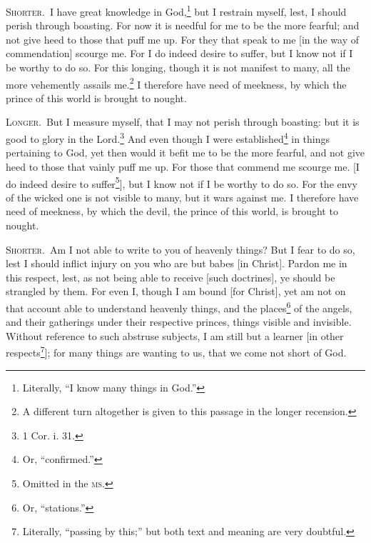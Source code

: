 
\textsc{Shorter.}~I have great knowledge in God,\footnote{Literally, “I know many things in God.”} but I restrain myself, lest, I should perish through boasting. For now it is needful for me to be the more fearful; and not give heed to those that puff me up. For they that speak to me [in the way of commendation] scourge me. For I do indeed desire to suffer, but I know not if I be worthy to do so. For this longing, though it is not manifest to many, all the more vehemently assails me.\footnote{A different turn altogether is given to this passage in the longer recension.} I therefore have need of meekness, by which the prince of this world is brought to nought.

\textsc{Longer.}~But I measure myself, that I may not perish through boasting: but it is good to glory in the Lord.\footnote{1 Cor. i. 31.} And even though I were established\footnote{Or, “confirmed.”} in things pertaining to God, yet then would it befit me to be the more fearful, and not give heed to those that vainly puff me up. For those that commend me scourge me. [I do indeed desire to suffer\footnote{Omitted in the \textsc{ms.}}], but I know not if I be worthy to do so. For the envy of the wicked one is not visible to many, but it wars against me. I therefore have need of meekness, by which the devil, the prince of this world, is brought to nought.


\textsc{Shorter.}~Am I not able to write to you of heavenly things? But I fear to do so, lest I should inflict injury on you who are but babes [in Christ]. Pardon me in this respect, lest, as not being able to receive [such doctrines], ye should be strangled by them. For even I, though I am bound [for Christ], yet am not on that account able to understand heavenly things, and the places\footnote{Or, “stations.”} of the angels, and their gatherings under their respective princes, things visible and invisible. Without reference to such abstruse subjects, I am still but a learner [in other respects\footnote{Literally, “passing by this;” but both text and meaning are very doubtful.}]; for many things are wanting to us, that we come not short of God.

